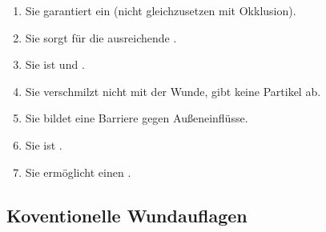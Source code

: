 \begin{enumerate}
  \item Sie garantiert ein  (nicht
  gleichzusetzen mit Okklusion).
  \item Sie sorgt für die ausreichende .
  \item Sie ist  und .
  \item Sie verschmilzt nicht mit der Wunde, gibt keine
  Partikel ab.
  \item Sie bildet eine Barriere gegen Außeneinflüsse.
  \item Sie ist .
  \item Sie ermöglicht einen .
\end{enumerate}


\subsection{Koventionelle Wundauflagen}

